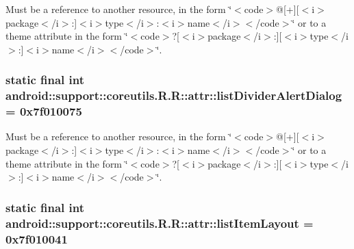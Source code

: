 Must be a reference to another resource, in the form \char`\"{}$<$code$>$@\mbox{[}+\mbox{]}\mbox{[}$<$i$>$package$<$/i$>$:\mbox{]}$<$i$>$type$<$/i$>$:$<$i$>$name$<$/i$>$$<$/code$>$\char`\"{} or to a theme attribute in the form \char`\"{}$<$code$>$?\mbox{[}$<$i$>$package$<$/i$>$:\mbox{]}\mbox{[}$<$i$>$type$<$/i$>$:\mbox{]}$<$i$>$name$<$/i$>$$<$/code$>$\char`\"{}. \hypertarget{classandroid_1_1support_1_1coreutils_1_1_r_1_1attr_6209d30642e513df5c5d2fd3c6c60069}{
\subsubsection[{listDividerAlertDialog}]{\setlength{\rightskip}{0pt plus 5cm}static final int android::support::coreutils.R.R::attr::listDividerAlertDialog = 0x7f010075}}
\label{classandroid_1_1support_1_1coreutils_1_1_r_1_1attr_6209d30642e513df5c5d2fd3c6c60069}


Must be a reference to another resource, in the form \char`\"{}$<$code$>$@\mbox{[}+\mbox{]}\mbox{[}$<$i$>$package$<$/i$>$:\mbox{]}$<$i$>$type$<$/i$>$:$<$i$>$name$<$/i$>$$<$/code$>$\char`\"{} or to a theme attribute in the form \char`\"{}$<$code$>$?\mbox{[}$<$i$>$package$<$/i$>$:\mbox{]}\mbox{[}$<$i$>$type$<$/i$>$:\mbox{]}$<$i$>$name$<$/i$>$$<$/code$>$\char`\"{}. \hypertarget{classandroid_1_1support_1_1coreutils_1_1_r_1_1attr_0cd03f853cf094e22e59cbb4e3db9ab5}{
\subsubsection[{listItemLayout}]{\setlength{\rightskip}{0pt plus 5cm}static final int android::support::coreutils.R.R::attr::listItemLayout = 0x7f010041}}
\label{classandroid_1_1support_1_1coreutils_1_1_r_1_1attr_0cd03f853cf094e22e59cbb4e3db9ab5}


